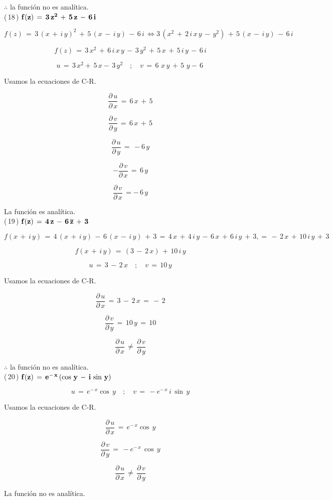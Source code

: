 \documentclass[a4paper,11pt,openany]{book}
\begin{document}
$\therefore$ la función no es analítica.\\

\textcolor{ao(english)}{(\,18\,)} $\bf{f(z)\,=\,3\,z^{2}\,+\,5\,z\,-\,6\,i}$

$$f(z)\,=\,3\,(x\,+\,i\,y)^{2}\,+\,5\,(x\,-\,i\,y)\,-\,6\,i\,\iff 3\,(x^{2}\,+\,2\,i\,x\,y\,-\,y^{2})\,+\,5\,(x\,-\,i\,y)\,-\,6\,i\, $$  

$$f(z)\,= \,3\,x^{2}\,+\,6\,i\,x\,y\,-\,3\,y^{2}\,+\,5\,x\,+\,5\,i\,y\,-\,6\,i$$

$$u\,=\,3\,x^{2}+\,5\,x-\,3\,y^{2} \quad;\quad v\,=\,6\,\,x\,y\,+\,5\,\,y-\,6\,$$

\textcolor{ao(english)}{} Usamos la ecuaciones de C-R.

$$\dfrac{\partial\,u}{\partial\,x}\,=\,6\,x\,+\,5$$

$$\dfrac{\partial\,v}{\partial\,y}\,=\,6\,x\,+\,5$$

$$\dfrac{\partial\,u}{\partial\,y}\,=\,-6\,y$$

$$-\dfrac{\partial\,v}{\partial\,x}\,=\,6\,y$$

$$\dfrac{\partial\,v}{\partial\,x}\,=-\,6\,y$$

La función es analítica.\\

\textcolor{ao(english)}{(\,19\,)} $\bf{f(z)\,=\,4\,z\,-\,6\,\overline{z}\,+\,3}$

$$f(x\,+\,i\,y)\,=\,4\,(x\,+\,i\,y)\,-\,6\,(x\,-\,i\,y)\,+\,3\,=\,4\,x\,+\,4\,i\,y\,-\,6\,x\,+\,6\,i\,y\,+\,3,=\,-\,2\,x\,+\,10\,i\,y\,+\,3$$

$$f(x\,+\,i\,y)\,=\,(3\,-\,2\,x)\,+\,10\,i\,y$$

$$u\,=\,3\,-\,2\,x \quad;\quad v\,=\,10\,y$$

\textcolor{ao(english)}{} Usamos la ecuaciones de C-R.

$$\dfrac{\partial\,u}{\partial\,x}\,=\,3\,-\,2\,x\,=\,-\,2$$

$$\dfrac{\partial\,v}{\partial\,y}\,=\,10\,y\,=\,10$$

$$\dfrac{\partial\,u}{\partial\,x}\,\neq\,\dfrac{\partial\,v}{\partial\,y}$$

$\therefore$ la función no es analítica.\\

\textcolor{ao(english)}{(\,20\,)} $\bf{f(z)\,=\,e^{-\,x}\,(\cos\,y\,-\,i\,\sin\,y)}$

$$u\,=\,e^{-\,x}\cos\,y \quad;\quad v\,=\,-e^{-\,x}\,i\,\sin\,y$$

\textcolor{ao(english)}{} Usamos la ecuaciones de C-R.

$$\dfrac{\partial\,u}{\partial\,x}\,=\,e^{-\,x}\cos\,y$$

$$\dfrac{\partial\,v}{\partial\,y}\,=\,-e^{-\,x}\,\cos\,y$$

$$\dfrac{\partial\,u}{\partial\,x}\,\neq\,\dfrac{\partial\,v}{\partial\,y}$$

La función no es analítica.\\
\end{document}
